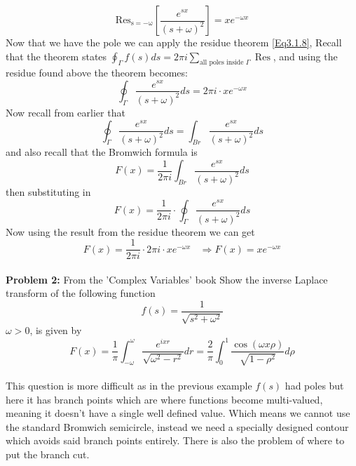 \begin{equation}
    \operatorname{Res_{s=-\omega}}\left[\frac{e^{sx}}{(s+\omega)^{2}}\right]=xe^{-\omega x}
\end{equation}
Now that we have the pole we can apply the residue theorem \ref{Eq3.1.8}, Recall that the theorem states $\oint_{\Gamma}f(s)ds=2\pi i\sum_{\text{all poles inside }\Gamma}\operatorname{Res}$, and using the residue found above the theorem becomes: 
\begin{equation}
    \oint_{\Gamma}\frac{e^{sx}}{(s+\omega)^{2}}ds=2\pi i\cdot xe^{-\omega x}
\end{equation}
Now recall from earlier that 
\begin{equation}
     \oint_{\Gamma}\frac{e^{sx}}{(s+\omega)^{2}}ds=\int_{Br}\frac{e^{sx}}{(s+\omega)^{2}}ds
\end{equation}
and also recall that the Bromwich formula is 
\begin{equation}
    F(x)=\frac{1}{2\pi i}\int_{Br}\frac{e^{sx}}{(s+\omega)^{2}}ds
\end{equation}
then substituting in 
\begin{equation}
    F(x)=\frac{1}{2\pi i}\cdot\oint_{\Gamma}\frac{e^{sx}}{(s+\omega)^{2}}ds
\end{equation} 
Now using the result from the residue theorem we can get 
\begin{equation}
    F(x)=\frac{1}{2\pi i}\cdot2\pi i\cdot xe^{-\omega x} \ \ \ \ \Rightarrow F(x)=xe^{-\omega x}
\end{equation}
\\
\textbf{Problem 2:} From the 'Complex Variables' book \cite{RedBook} 
 Show the inverse Laplace transform of the following function 
 \begin{equation}
     f(s)=\frac{1}{\sqrt{s^2+\omega^2}}
 \end{equation}
$\omega>0$, is given by 
\begin{equation}
    F(x)=\frac{1}{\pi}\int^{\omega}_{-\omega}\frac{e^{ixr}}{\sqrt{\omega^2-r^2}}dr=\frac{2}{\pi}\int^{1}_{0}\frac{\cos(\omega x\rho)}{\sqrt{1-\rho^2}}d\rho
\end{equation}
\\
This question is more difficult as in the previous example $f(s)$ had poles but here it has branch points which are where functions become multi-valued, meaning it doesn't have a single well defined value. Which means we cannot use the standard Bromwich semicircle, instead we need a specially designed contour which avoids said branch points entirely. There is also the problem of where to put the branch cut. 
